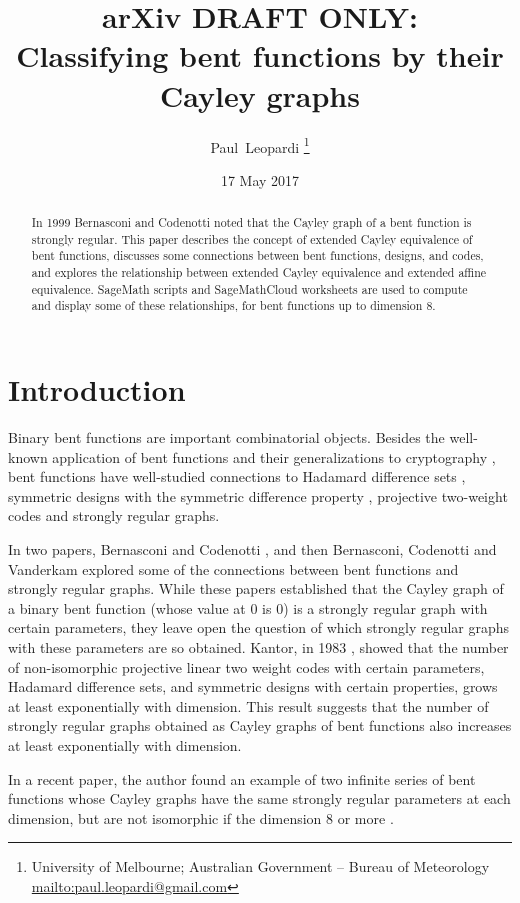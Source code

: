 \documentclass[12pt,a4paper]{article}
\title{arXiv DRAFT ONLY: \\
Classifying bent functions by their Cayley graphs}
\author{
Paul~Leopardi
\thanks{University of Melbourne; Australian Government -- Bureau of Meteorology
\protect\url{mailto:paul.leopardi@gmail.com}}
}
\date{17 May 2017}
\begin{document}
\maketitle

\begin{abstract}
%
In 1999 Bernasconi and Codenotti noted that the Cayley graph of a bent function is strongly regular.
This paper describes the concept of extended Cayley equivalence of bent functions,
discusses some connections between bent functions, designs, and codes,
and explores the relationship between extended Cayley equivalence and extended affine equivalence.
SageMath scripts and Sage\-Math\-Cloud worksheets are used to compute and display some of these relationships,
for bent functions up to dimension 8.
%
\end{abstract}

\section{Introduction}
\label{sec-Introduction}
Binary bent functions are important combinatorial objects.
Besides the well-known application of bent functions and their generalizations to cryptography
\cite{Ada97} \cite[4.1-4.6]{Tok15bent},
bent functions have well-studied connections to Hadamard difference sets \cite{Dil74},
symmetric designs with the symmetric difference property \cite{DilS87block,Kan75symplectic},
projective two-weight codes \cite{DinD15class} and strongly regular graphs.

In two papers, Bernasconi and Codenotti \cite{BerC99}, and then Bernasconi, Codenotti and Vanderkam
\cite{BerCV01} explored some of the connections
between bent functions and strongly regular graphs.
While these papers established that the Cayley graph of a binary bent function (whose value at 0 is
0) is a strongly regular graph
with certain parameters, they leave open the question of which strongly regular graphs with these
parameters are so obtained.
Kantor, in 1983 \cite{Kan83exponential}, showed that the number of non-isomorphic projective linear
two weight codes with certain parameters,
Hadamard difference sets, and symmetric designs with certain properties, grows at least exponentially
with dimension.
This result suggests that the number of strongly regular graphs obtained as Cayley graphs of bent
functions also increases at least exponentially with dimension.

In a recent paper, the author found an example of two infinite series of bent functions whose
Cayley graphs have the same strongly regular parameters at each dimension,
but are not isomorphic if the dimension 8 or more \cite{Leo17Hurwitz}.
\end{document}
